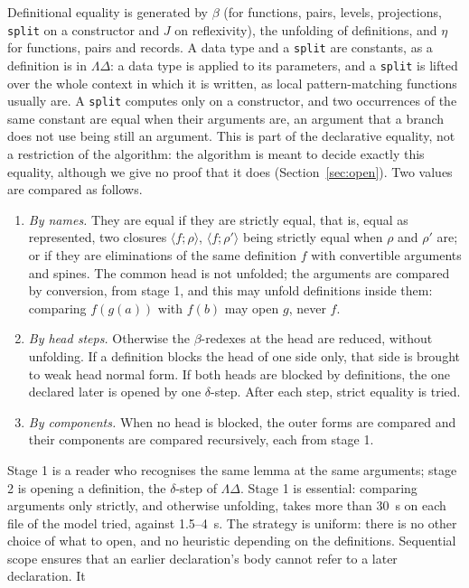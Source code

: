 \documentclass[11pt]{article}
\newcommand{\kw}[1]{\texttt{#1}}
\begin{document}
Definitional equality is generated by $\beta$ (for functions, pairs,
levels, projections, \kw{split} on a constructor and $J$ on reflexivity),
the unfolding of definitions, and $\eta$ for functions, pairs and
records. A data
type and a \kw{split} are constants, as a definition is in
$\Lambda\Delta$: a data type is applied to its parameters, and a
\kw{split} is lifted over the whole context in which it is written, as
local pattern-matching functions usually are. A \kw{split} computes
only on a constructor, and two occurrences of the same constant are
equal when their arguments are, an argument that a branch does not use
being still an argument. This is part of the declarative equality, not a
restriction of the algorithm: the algorithm is meant to decide exactly
this equality, although we give no proof that it does
(Section~\ref{sec:open}). Two values are compared as follows.
\begin{enumerate}
\item \emph{By names.} They are equal if they are strictly equal, that
  is, equal as represented, two closures $\langle f;\rho\rangle$,
  $\langle f;\rho'\rangle$ being strictly equal when $\rho$ and $\rho'$
  are; or if they are eliminations of the same definition $f$ with
  convertible arguments and spines. The common head is not unfolded;
  the arguments are compared by conversion, from stage 1, and this
  may unfold definitions inside them: comparing $f(g(a))$ with $f(b)$
  may open $g$, never $f$.
\item \emph{By head steps.} Otherwise the $\beta$-redexes at the head are
  reduced, without unfolding. If a definition blocks the head of one side
  only, that side is brought to weak head normal form. If both heads are
  blocked by definitions, the one declared later is opened by one
  $\delta$-step. After each step, strict equality is tried.
\item \emph{By components.} When no head is blocked, the outer forms are
  compared and their components are compared recursively, each from
  stage 1.
\end{enumerate}
Stage 1 is a reader who recognises the same lemma at the same arguments;
stage 2 is opening a definition, the $\delta$-step of $\Lambda\Delta$.
Stage 1 is essential: comparing arguments only strictly, and otherwise
unfolding, takes more than 30~s on each file of the model tried, against
1.5--4~s. The strategy is uniform: there is no other choice of what to open, and
no heuristic depending on the definitions. Sequential scope ensures that
an earlier declaration's body cannot refer to a later declaration. It
\end{document}
